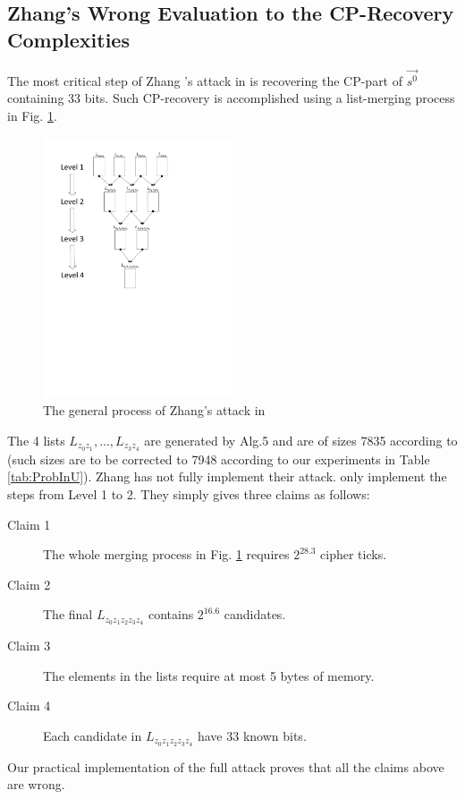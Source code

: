 \subsection{Zhang's Wrong Evaluation to the CP-Recovery Complexities}\label{sec:ZhangWrongCompAnalysis}
The most critical step of Zhang \etal's attack in \cite{AC:Zhang19} is recovering the CP-part of $\vec{s^0}$ containing 33 bits. 
Such CP-recovery is accomplished using a list-merging process in Fig. \ref{fig:MergeZhang}.
\begin{figure}[htbp]
  \centering
  \includegraphics[width=0.5\textwidth]{pic/MergeZhang.pdf}
  \caption{The general process of Zhang's attack in \cite{AC:Zhang19}}\label{fig:MergeZhang}
\end{figure}
The 4 lists $L_{z_0z_1},\ldots, L_{z_3z_4}$ are generated by Alg.5 and are of sizes 7835 according to \cite{AC:Zhang19} (such sizes are to be corrected to 7948 according to our experiments in Table \ref{tab:ProbInU}).
Zhang \etal has not fully implement their attack.
\cite{AC:Zhang19} only implement the steps from Level 1 to 2.
They simply gives three claims as follows:
\begin{description}
  \item[Claim 1] The whole merging process in Fig. \ref{fig:MergeZhang} requires $2^{28.3}$ cipher ticks.
  \item[Claim 2] The final $L_{z_0z_1z_2z_3z_4}$ contains $2^{16.6}$ candidates.
  \item[Claim 3] The elements in the lists require at most 5 bytes of memory.
  \item[Claim 4] Each candidate in $L_{z_0z_1z_2z_3z_4}$ have 33 known bits.
\end{description}
Our practical implementation of the full attack proves that all the claims above are wrong.

